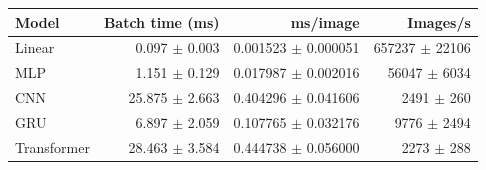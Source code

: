 \begin{tabular}{lrrr}
\toprule
Model & Batch time (ms) & ms/image & Images/s \\
\midrule
Linear & 0.097 $\pm$ 0.003 & 0.001523 $\pm$ 0.000051 & 657237 $\pm$ 22106 \\
MLP & 1.151 $\pm$ 0.129 & 0.017987 $\pm$ 0.002016 & 56047 $\pm$ 6034 \\
CNN & 25.875 $\pm$ 2.663 & 0.404296 $\pm$ 0.041606 & 2491 $\pm$ 260 \\
GRU & 6.897 $\pm$ 2.059 & 0.107765 $\pm$ 0.032176 & 9776 $\pm$ 2494 \\
Transformer & 28.463 $\pm$ 3.584 & 0.444738 $\pm$ 0.056000 & 2273 $\pm$ 288 \\
\bottomrule
\end{tabular}
